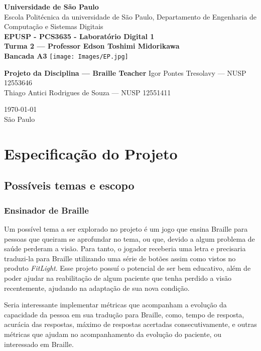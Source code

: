 \documentclass[amsmath,amssymb,floatfix]{report}
\begin{document}
\begin{titlepage}
	\centering
	\vfill \textbf{\Large Universidade de São Paulo} \\
	\large Escola Politécnica da universidade de São Paulo, Departamento de Engenharia de Computação e Sistemas Digitais \\ \vfill
\textbf{EPUSP - PCS3635 - Laboratório Digital 1} \\
\textbf{Turma 2 --- Professor Edson Toshimi Midorikawa} \\
\textbf{Bancada A3}
\vfill
\texttt{[image: Images/EP.jpg]} \vfill

\textbf{\huge{Projeto da Disciplina --- Braille Teacher}} \vfill 
Igor Pontes Tresolavy --- NUSP 12553646\\
Thiago Antici Rodrigues de Souza --- NUSP 12551411

\mbox{}
\vfill

\today \\
São Paulo
\end{titlepage}

\tableofcontents

\chapter{Especificação do Projeto}

\section{Possíveis temas e escopo}

\subsection{Ensinador de Braille}

Um possível tema a ser explorado no projeto é um jogo que ensina Braille para pessoas que queiram se aprofundar no tema, ou que, devido a algum problema de saúde perderam a visão. Para tanto, o jogador receberia uma letra e precisaria traduzi-la para Braille utilizando uma série de botões assim como vistos no produto \textit{FitLight}. Esse projeto possuí o potencial de ser bem educativo, além de poder ajudar na reabilitação de algum paciente que tenha perdido a visão recentemente, ajudando na adaptação de sua nova condição.

Seria interessante implementar métricas que acompanham a evolução da capacidade da pessoa em sua tradução para Braille, como, tempo de resposta, acurácia das respostas, máximo de respostas acertadas consecutivamente, e outras métricas que ajudam no acompanhamento da evolução do paciente, ou interessado em Braille.
\end{document}

